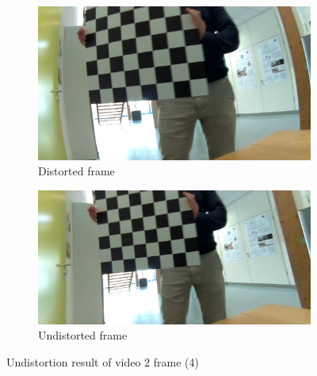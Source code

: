 \begin{figure}[h]
    \centering
    \begin{subfigure}[b]{0.48\textwidth}
        \centering
        \includegraphics[width=\textwidth]{figures/addl/img14_0.jpg}
        \caption{Distorted frame}
    \end{subfigure}
    \hfill
    \begin{subfigure}[b]{0.48\textwidth}
        \centering
        \includegraphics[width=\textwidth]{figures/addl/img14_5.jpg}
        \caption{Undistorted frame}
    \end{subfigure}
    \caption{Undistortion result of video 2 frame (4)}
    \label{fig:dist_2a4}
\end{figure}